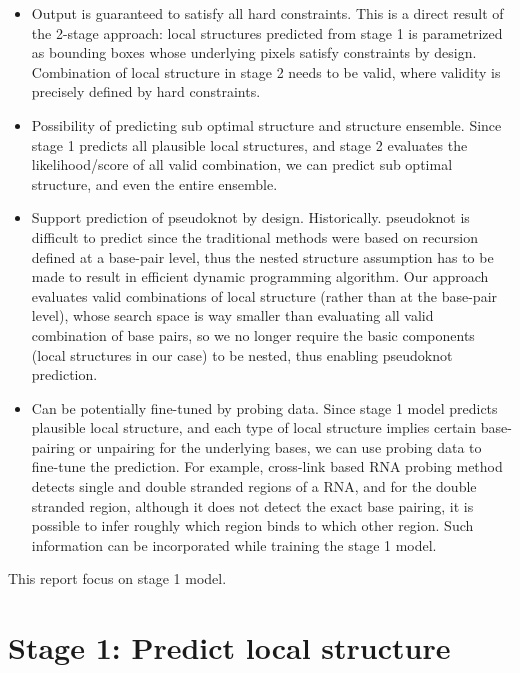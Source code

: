 \documentclass[12pt]{article}
\begin{document}
\begin{itemize}
    \item Output is guaranteed to satisfy all hard constraints.
    This is a direct result of the 2-stage approach:
    local structures predicted from stage 1 is parametrized as bounding boxes whose underlying pixels
    satisfy constraints by design.
    Combination of local structure in stage 2 needs to be valid, where validity is precisely defined by hard constraints.

    \item Possibility of predicting sub optimal structure and structure ensemble.
    Since stage 1 predicts all plausible local structures, and stage 2 evaluates the
    likelihood/score of all valid combination, we can predict sub optimal structure,
    and even the entire ensemble.

    \item Support prediction of pseudoknot by design.
    Historically. pseudoknot is difficult to predict since the traditional methods
    were based on recursion defined at a base-pair level,
    thus the nested structure assumption has to be made to result in efficient
    dynamic programming algorithm.
    Our approach evaluates valid combinations of local structure
    (rather than at the base-pair level), whose search space is way smaller than
    evaluating all valid combination of base pairs, so we no longer require the basic components
    (local structures in our case) to be nested, thus enabling pseudoknot prediction.

    \item Can be potentially fine-tuned by probing data.
    Since stage 1 model predicts plausible local structure, and each type of local structure
    implies certain base-pairing or unpairing for the underlying bases,
    we can use probing data to fine-tune the prediction.
    For example, cross-link based RNA probing method detects single and double stranded regions of a RNA,
    and for the double stranded region, although it does not detect the exact base pairing,
    it is possible to infer roughly which region binds to which other region.
    Such information can be incorporated while training the stage 1 model.

\end{itemize}

This report focus on stage 1 model.


\section{Stage 1: Predict local structure}
\end{document}
